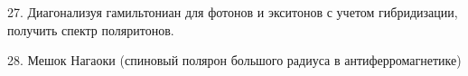 \documentclass[a4paper,12pt]{article} %
\begin{document}
\begin{ttask}

27. Диагонализуя гамильтониан для фотонов и экситонов с учетом гибридизации, получить спектр поляритонов. 














\end{ttask}



\begin{ttask}

28. Мешок Нагаоки (спиновый полярон большого радиуса в антиферромагнетике)






\end{ttask}
\end{document}
